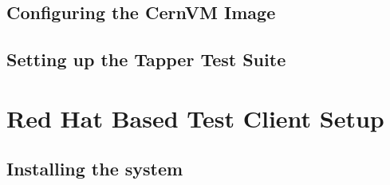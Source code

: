 \subsection{Configuring the CernVM Image}
\subsection{Setting up the Tapper Test Suite}

\section{Red Hat Based Test Client Setup}
\subsection{Installing the system}
\label{sec:fedorainstall}
\flushleft
